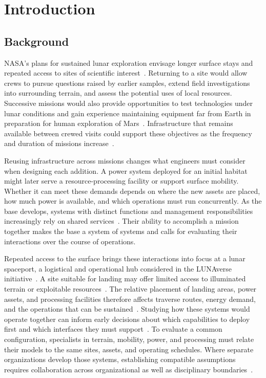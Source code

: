 \documentclass[10pt]{article}
\begin{document}
  \section{Introduction}
\fi

\subsection{Background}

NASA's plans for sustained lunar exploration envisage longer surface stays and repeated access to sites of scientific interest~\cite{nasa_moonbase_faq_2026}. Returning to a site would allow crews to pursue questions raised by earlier samples, extend field investigations into surrounding terrain, and assess the potential uses of local resources. Successive missions would also provide opportunities to test technologies under lunar conditions and gain experience maintaining equipment far from Earth in preparation for human exploration of Mars~\cite{merancy_moon_to_mars_2025}. Infrastructure that remains available between crewed visits could support these objectives as the frequency and duration of missions increase~\cite{nasa_moonbase_faq_2026,merancy_moon_to_mars_2025}.

Reusing infrastructure across missions changes what engineers must consider when designing each addition. A power system deployed for an initial habitat might later serve a resource-processing facility or support surface mobility. Whether it can meet these demands depends on where the new assets are placed, how much power is available, and which operations must run concurrently. As the base develops, systems with distinct functions and management responsibilities increasingly rely on shared services~\cite{nasa_moonbase_guide_2026,darpa_luna10_results_2024}. Their ability to accomplish a mission together makes the base a system of systems and calls for evaluating their interactions over the course of operations.

Repeated access to the surface brings these interactions into focus at a lunar spaceport, a logistical and operational hub considered in the LUNAverse initiative~\cite{mueller_lunaverse_preprint_2026}. A site suitable for landing may offer limited access to illuminated terrain or exploitable resources~\cite{nasa_moonbase_faq_2026}. The relative placement of landing areas, power assets, and processing facilities therefore affects traverse routes, energy demand, and the operations that can be sustained~\cite{mueller_lunaverse_preprint_2026,speyerer_traverse_2016}. Studying how these systems would operate together can inform early decisions about which capabilities to deploy first and which interfaces they must support~\cite{merancy_moon_to_mars_2025}. To evaluate a common configuration, specialists in terrain, mobility, power, and processing must relate their models to the same sites, assets, and operating schedules. Where separate organizations develop those systems, establishing compatible assumptions requires collaboration across organizational as well as disciplinary boundaries~\cite{darpa_luna10_results_2024,mueller_lunaverse_preprint_2026}.
\end{document}
